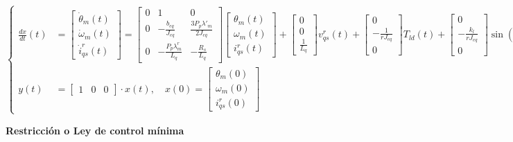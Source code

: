 \documentclass{article}
\begin{document}
\begin{equation}
\left\{
\begin{aligned}
\frac{dx}{dt}(t) &= \begin{bmatrix} \dot{\theta}_m(t) \\ \dot{\omega}_m(t) \\ \dot{i}^r_{qs}(t) \end{bmatrix} = 
\begin{bmatrix} 
0 & 1 & 0 \\
0 & -\frac{b_{eq}}{J_{eq}} & \frac{3P_p\lambda'_m}{2J_{eq}} \\
0 & -\frac{P_p\lambda^r_m}{L_q} & -\frac{R_s}{L_q}
\end{bmatrix}
\begin{bmatrix} \theta_m(t) \\ \omega_m(t) \\ i^r_{qs}(t) \end{bmatrix} +
\begin{bmatrix} 0 \\ 0 \\ \frac{1}{L_q} \end{bmatrix}v^r_{qs}(t) +
\begin{bmatrix} 0 \\ -\frac{1}{rJ_{eq}} \\ 0 \end{bmatrix}T_{ld}(t) +
\begin{bmatrix} 0 \\ -\frac{k_l}{rJ_{eq}} \\ 0 \end{bmatrix}\sin(\frac{1}{r}\theta_m(t)) \\[2ex]
y(t) &= \begin{bmatrix} 1 & 0 & 0 \end{bmatrix}\cdot x(t), \quad
x(0) = \begin{bmatrix} \theta_m(0) \\ \omega_m(0) \\ i^r_{qs}(0) \end{bmatrix}
\end{aligned}
\right.
\end{equation}

\newpage
\noindent\textbf{Restricción o Ley de control mínima}
\end{document}
